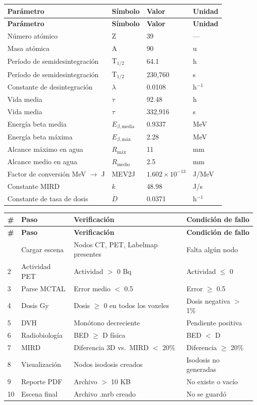 \documentclass[12pt,a4paper]{article}
\begin{document}
\begin{longtable}{p{6cm} p{3cm} p{2cm} p{2cm}}
\toprule
\textbf{Parámetro} & \textbf{Símbolo} & \textbf{Valor} & \textbf{Unidad} \\
\midrule
\endfirsthead
\toprule
\textbf{Parámetro} & \textbf{Símbolo} & \textbf{Valor} & \textbf{Unidad} \\
\midrule
\endhead
\bottomrule
\endfoot
Número atómico & Z & 39 & --- \\
Masa atómica & A & 90 & u \\
Período de semidesintegración & T$_{1/2}$ & 64.1 & h \\
Período de semidesintegración & T$_{1/2}$ & 230,760 & s \\
Constante de desintegración & $\lambda$ & 0.0108 & h$^{-1}$ \\
Vida media & $\tau$ & 92.48 & h \\
Vida media & $\tau$ & 332,916 & s \\
Energía beta media & $E_{\beta,\text{media}}$ & 0.9337 & MeV \\
Energía beta máxima & $E_{\beta,\text{máx}}$ & 2.28 & MeV \\
Alcance máximo en agua & $R_{\text{máx}}$ & 11 & mm \\
Alcance medio en agua & $R_{\text{medio}}$ & 2.5 & mm \\
Factor de conversión MeV $\to$ J & MEV2J & $1.602\times10^{-13}$ & J/MeV \\
Constante MIRD & $k$ & 48.98 & J/s \\
Constante de tasa de dosis & $\dot{D}$ & 0.0371 & h$^{-1}$ \\
\bottomrule
\end{longtable}



\begin{longtable}{p{0.5cm} p{4cm} p{4.5cm} p{5cm}}
\toprule
\textbf{\#} & \textbf{Paso} & \textbf{Verificación} & \textbf{Condición de fallo} \\
\midrule
\endfirsthead
\toprule
\textbf{\#} & \textbf{Paso} & \textbf{Verificación} & \textbf{Condición de fallo} \\
\midrule
\endhead
\bottomrule
\endfoot
1 & Cargar escena & Nodos CT, PET, Labelmap presentes & Falta algún nodo \\
2 & Actividad PET & Actividad $>$ 0 Bq & Actividad $\leq$ 0 \\
3 & Parse MCTAL & Error medio $<$ 0.5 & Error $\geq$ 0.5 \\
4 & Dosis Gy & Dosis $\geq$ 0 en todos los voxeles & Dosis negativa $>$ 1\% \\
5 & DVH & Monótono decreciente & Pendiente positiva \\
6 & Radiobiología & BED $\geq$ D física & BED $<$ D \\
7 & MIRD & Diferencia 3D vs.\ MIRD $<$ 20\% & Diferencia $\geq$ 20\% \\
8 & Visualización & Nodos isodosis creados & Isodosis no generadas \\
9 & Reporte PDF & Archivo $>$ 10 KB & No existe o vacío \\
10 & Escena final & Archivo .mrb creado & No se guardó \\
\end{longtable}
\end{document}
